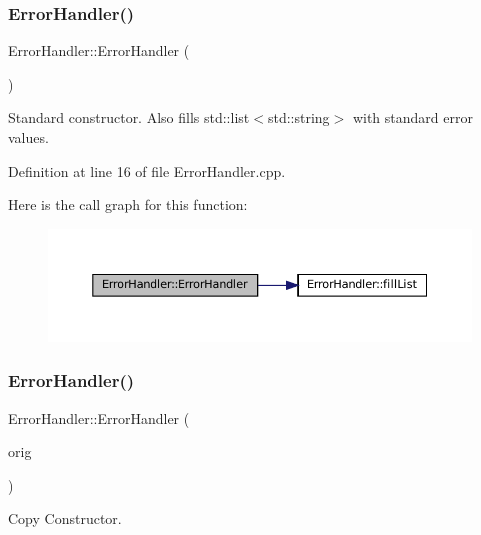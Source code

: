 \subsubsection{\texorpdfstring{ErrorHandler()}{ErrorHandler()}\hspace{0.1cm}{\footnotesize\ttfamily [1/2]}}
{\footnotesize\ttfamily Error\+Handler\+::\+Error\+Handler (\begin{DoxyParamCaption}{ }\end{DoxyParamCaption})}



Standard constructor. Also fills std\+::list$<$std\+::string$>$ with standard error values. 



Definition at line 16 of file Error\+Handler.\+cpp.

Here is the call graph for this function\+:\nopagebreak
\begin{figure}[H]
\begin{center}
\leavevmode
\includegraphics[width=350pt]{classErrorHandler_a7e5f379bd231442b898cef94556b2107_cgraph}
\end{center}
\end{figure}
\mbox{\label{classErrorHandler_add20b373ee276ee2ef040f6dd913a86b}} 
\subsubsection{\texorpdfstring{ErrorHandler()}{ErrorHandler()}\hspace{0.1cm}{\footnotesize\ttfamily [2/2]}}
{\footnotesize\ttfamily Error\+Handler\+::\+Error\+Handler (\begin{DoxyParamCaption}\item[{const \mbox{\hyperlink{classErrorHandler}{Error\+Handler}} \&}]{orig }\end{DoxyParamCaption})}



Copy Constructor. 


